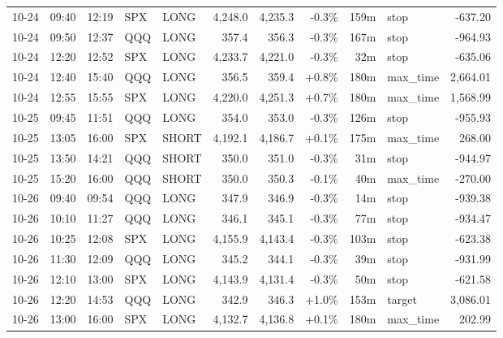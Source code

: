 \documentclass[11pt,a4paper,twoside]{article}
\begin{document}
\begin{center}
\begin{longtable}{>{\color{txtmain}}l l l l l r r r r >{\color{txtmain}}l r}
10-24 & 09:40 & 12:19 & SPX & LONG & 4,248.0 & 4,235.3 & \textcolor{lossred}{-0.3\%} & 159m & stop & \textcolor{lossred}{-637.20} \\
10-24 & 09:50 & 12:37 & QQQ & LONG & 357.4 & 356.3 & \textcolor{lossred}{-0.3\%} & 167m & stop & \textcolor{lossred}{-964.93} \\
10-24 & 12:20 & 12:52 & SPX & LONG & 4,233.7 & 4,221.0 & \textcolor{lossred}{-0.3\%} & 32m & stop & \textcolor{lossred}{-635.06} \\
10-24 & 12:40 & 15:40 & QQQ & LONG & 356.5 & 359.4 & \textcolor{wingreen}{+0.8\%} & 180m & max\_time & \textcolor{wingreen}{2,664.01} \\
10-24 & 12:55 & 15:55 & SPX & LONG & 4,220.0 & 4,251.3 & \textcolor{wingreen}{+0.7\%} & 180m & max\_time & \textcolor{wingreen}{1,568.99} \\
10-25 & 09:45 & 11:51 & QQQ & LONG & 354.0 & 353.0 & \textcolor{lossred}{-0.3\%} & 126m & stop & \textcolor{lossred}{-955.93} \\
10-25 & 13:05 & 16:00 & SPX & SHORT & 4,192.1 & 4,186.7 & \textcolor{wingreen}{+0.1\%} & 175m & max\_time & \textcolor{wingreen}{268.00} \\
10-25 & 13:50 & 14:21 & QQQ & SHORT & 350.0 & 351.0 & \textcolor{lossred}{-0.3\%} & 31m & stop & \textcolor{lossred}{-944.97} \\
10-25 & 15:20 & 16:00 & QQQ & SHORT & 350.0 & 350.3 & \textcolor{lossred}{-0.1\%} & 40m & max\_time & \textcolor{lossred}{-270.00} \\
10-26 & 09:40 & 09:54 & QQQ & LONG & 347.9 & 346.9 & \textcolor{lossred}{-0.3\%} & 14m & stop & \textcolor{lossred}{-939.38} \\
10-26 & 10:10 & 11:27 & QQQ & LONG & 346.1 & 345.1 & \textcolor{lossred}{-0.3\%} & 77m & stop & \textcolor{lossred}{-934.47} \\
10-26 & 10:25 & 12:08 & SPX & LONG & 4,155.9 & 4,143.4 & \textcolor{lossred}{-0.3\%} & 103m & stop & \textcolor{lossred}{-623.38} \\
10-26 & 11:30 & 12:09 & QQQ & LONG & 345.2 & 344.1 & \textcolor{lossred}{-0.3\%} & 39m & stop & \textcolor{lossred}{-931.99} \\
10-26 & 12:10 & 13:00 & SPX & LONG & 4,143.9 & 4,131.4 & \textcolor{lossred}{-0.3\%} & 50m & stop & \textcolor{lossred}{-621.58} \\
10-26 & 12:20 & 14:53 & QQQ & LONG & 342.9 & 346.3 & \textcolor{wingreen}{+1.0\%} & 153m & target & \textcolor{wingreen}{3,086.01} \\
10-26 & 13:00 & 16:00 & SPX & LONG & 4,132.7 & 4,136.8 & \textcolor{wingreen}{+0.1\%} & 180m & max\_time & \textcolor{wingreen}{202.99} \\

\end{longtable}
\end{center}
\end{document}
